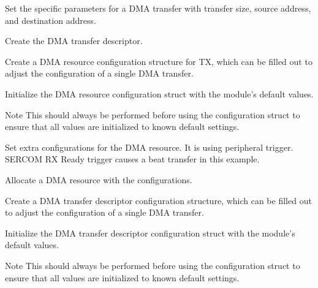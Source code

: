 \begin{DoxyEnumerate}
\item Set the specific parameters for a D\+M\+A transfer with transfer size, source address, and destination address. 
\begin{DoxyCodeInclude}
\end{DoxyCodeInclude}

\item Create the D\+M\+A transfer descriptor. 
\begin{DoxyCodeInclude}
\end{DoxyCodeInclude}

\item Create a D\+M\+A resource configuration structure for T\+X, which can be filled out to adjust the configuration of a single D\+M\+A transfer. 
\begin{DoxyCodeInclude}
\end{DoxyCodeInclude}

\item Initialize the D\+M\+A resource configuration struct with the module's default values. 
\begin{DoxyCodeInclude}
\end{DoxyCodeInclude}
 \begin{DoxyNote}{Note}
This should always be performed before using the configuration struct to ensure that all values are initialized to known default settings.
\end{DoxyNote}

\item Set extra configurations for the D\+M\+A resource. It is using peripheral trigger. S\+E\+R\+C\+O\+M R\+X Ready trigger causes a beat transfer in this example. 
\begin{DoxyCodeInclude}
\end{DoxyCodeInclude}

\item Allocate a D\+M\+A resource with the configurations. 
\begin{DoxyCodeInclude}
\end{DoxyCodeInclude}

\item Create a D\+M\+A transfer descriptor configuration structure, which can be filled out to adjust the configuration of a single D\+M\+A transfer. 
\begin{DoxyCodeInclude}
\end{DoxyCodeInclude}

\item Initialize the D\+M\+A transfer descriptor configuration struct with the module's default values. 
\begin{DoxyCodeInclude}
\end{DoxyCodeInclude}
 \begin{DoxyNote}{Note}
This should always be performed before using the configuration struct to ensure that all values are initialized to known default settings.
\end{DoxyNote}


\end{DoxyEnumerate}
